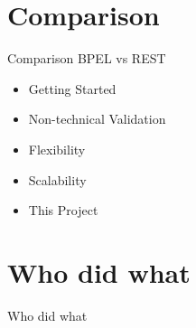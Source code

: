 

\section{Comparison}
\begin{frame}{Comparison BPEL vs REST}
\begin{itemize}
\item Getting Started
\item Non-technical Validation
\item Flexibility
\item Scalability
\item This Project
\end{itemize}
\end{frame}


\section{Who did what}
\begin{frame}{Who did what}

\end{frame}


